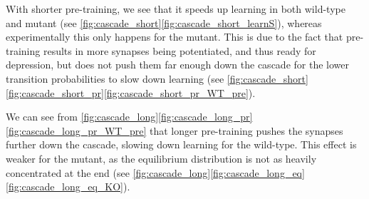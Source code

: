 \documentclass[12pt]{article}
\begin{document}
With shorter pre-training, we see that it speeds up learning in both wild-type and mutant (see \autoref{fig:cascade_short}\ref{fig:cascade_short_learnS}), whereas experimentally this only happens for the mutant.
This is due to the fact that pre-training results in more synapses being potentiated, and thus ready for depression, but does not push them far enough down the cascade for the lower transition probabilities to slow down learning (see \autoref{fig:cascade_short}\ref{fig:cascade_short_pr}\ref{fig:cascade_short_pr_WT_pre}).

We can see from \autoref{fig:cascade_long}\ref{fig:cascade_long_pr}\ref{fig:cascade_long_pr_WT_pre} that longer pre-training pushes the synapses further down the cascade, slowing down learning for the wild-type.
This effect is weaker for the mutant, as the equilibrium distribution is not as heavily concentrated at the end (see \autoref{fig:cascade_long}\ref{fig:cascade_long_eq}\ref{fig:cascade_long_eq_KO}).







\end{document}
